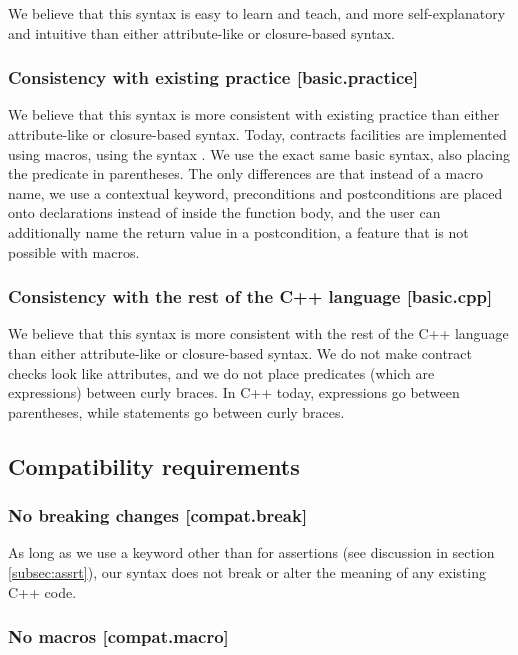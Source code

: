 We believe that this syntax is easy to learn and teach, and more self-explanatory and intuitive than either attribute-like or closure-based syntax.

\subsubsection{Consistency with existing practice  [basic.practice]}

We believe that this syntax is more consistent with existing practice than either attribute-like or closure-based syntax. Today, contracts facilities are implemented using macros, using the syntax . We use the exact same basic syntax, also placing the predicate in parentheses. The only differences are that instead of a macro name, we use a contextual keyword, preconditions and postconditions are placed onto declarations instead of inside the function body, and the user can additionally name the return value in a postcondition, a feature that is not possible with macros.

\subsubsection{Consistency with the rest of the C++ language  [basic.cpp]}

We believe that this syntax is more consistent with the rest of the C++ language than either attribute-like or closure-based syntax. We do not make contract checks look like attributes, and we do not place predicates (which are expressions) between curly braces. In C++ today, expressions go between parentheses, while statements go between curly braces.

\subsection{Compatibility requirements}

\subsubsection{No breaking changes  [compat.break]}

As long as we use a keyword other than  for assertions (see discussion in section \ref{subsec:assrt}), our syntax does not break or alter the meaning of any existing C++ code.

\subsubsection{No macros  [compat.macro]}

